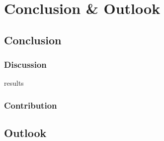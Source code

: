 \chapter{Conclusion \& Outlook}\label{ch:conclusion-outlook}

\section{Conclusion}\label{sec:conclusion}

\subsection{Discussion}\label{subsec:discussion}
results

\subsection{Contribution}\label{subsec:contribution}





\section{Outlook}\label{sec:outlook}



